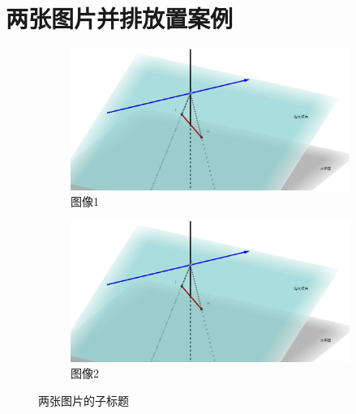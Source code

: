 \section{两张图片并排放置案例}

\begin{figure}[htbp]
    \centering
    \begin{subfigure}[b]{0.45\textwidth}
      \centering
      \includegraphics[width=\textwidth]{res/img/测坡面示意图.png}
      \caption{图像1}
      \label{fig:image1}
    \end{subfigure}
    \hfill
    \begin{subfigure}[b]{0.45\textwidth}
      \centering
      \includegraphics[width=\textwidth]{res/img/测坡面示意图.png}
      \caption{图像2}
      \label{fig:image2}
    \end{subfigure}
    \caption{两张图片的子标题}
    \label{fig:two_images}
  \end{figure}